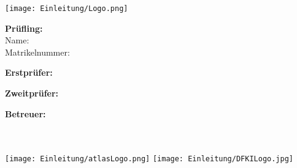 \begin{titlepage}
	\begin{onehalfspace}
		\begin{center}
			\texttt{[image: Einleitung/Logo.png]}

			\vspace*{20mm}

			\LARGE \textbf{\Subject}

			\vspace*{10mm}

			\Huge \Title

			\vspace*{10mm}
			
			\normalsize
			\textbf{Prüfling:}\\
			\vspace*{2mm}
			Name: \Pruefling\\
			\vspace*{1mm}
			Matrikelnummer: \Matrikelnr
			\vspace*{10mm}
			
			\textbf{Erstprüfer:}\\
			\Erstpruefer

			\vspace*{1mm}

			\textbf{Zweitprüfer:}\\
			\Zweitpruefer

			\vspace*{5mm}
			
			\textbf{Betreuer:}\\
			\BetreuerA\\
			\BetreuerB\\
		\end{center}

		\vfill

		\texttt{[image: Einleitung/atlasLogo.png]}
		\hfill
		\texttt{[image: Einleitung/DFKILogo.jpg]}

		\vspace*{-1cm}
	\end{onehalfspace}
\end{titlepage}
